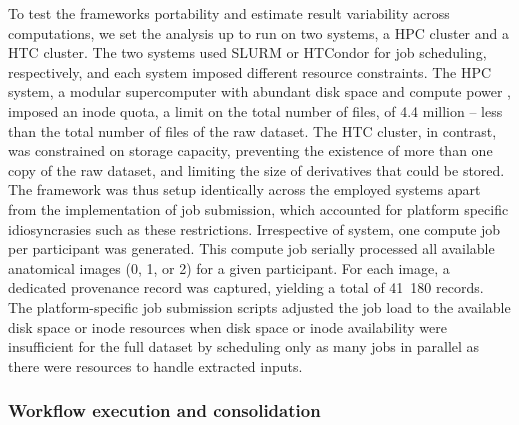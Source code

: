 To test the frameworks portability and estimate result variability across computations, we set the analysis up to run on two systems, a \gls{HPC} cluster and a \gls{HTC} cluster.
The two systems used SLURM or HTCondor for job scheduling, respectively, and each system imposed different resource constraints.
The \gls{HPC} system, a modular supercomputer with abundant disk space and compute power \citep{krause2018jureca}, imposed an inode quota, a limit on the total number of files, of 4.4 million -- less than the total number of files of the raw dataset.
The \gls{HTC} cluster, in contrast, was constrained on storage capacity, preventing the existence of more than one copy of the raw dataset, and limiting the size of derivatives that could be stored.
The framework was thus setup identically across the employed systems apart from the implementation of job submission, which accounted for platform specific idiosyncrasies such as these restrictions.
Irrespective of system, one compute job per participant was generated.
This compute job serially processed all available anatomical images (0, 1, or 2) for a given participant.
For each image, a dedicated provenance record was captured, yielding a total of 41~180 records.
The platform-specific job submission scripts adjusted the job load to the available disk space or inode resources when disk space or inode availability were insufficient for the full dataset by scheduling only as many jobs in parallel as there were resources to handle extracted inputs.

\subsubsection{Workflow execution and consolidation}

